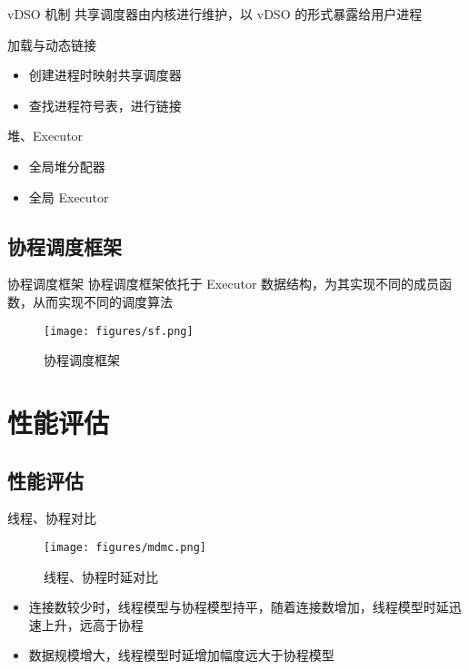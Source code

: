 \documentclass{beamer}
\begin{document}
\begin{frame}{vDSO 机制}
  共享调度器由内核进行维护，以 vDSO 的形式暴露给用户进程
  \begin{block}{加载与动态链接}
    \begin{itemize}
      \item 创建进程时映射共享调度器
      \item 查找进程符号表，进行链接
    \end{itemize}
  \end{block}
  \begin{block}{堆、Executor}
    \begin{itemize}
      \item 全局堆分配器
      \item 全局 Executor
    \end{itemize}
  \end{block}
  
\end{frame}

\subsection{协程调度框架}

\begin{frame}{协程调度框架}
  协程调度框架依托于 Executor 数据结构，为其实现不同的成员函数，从而实现不同的调度算法
  \begin{figure}[htbp]
    \centering
    \texttt{[image: figures/sf.png]}
    \caption{协程调度框架}
    \label{fig:sf}
  \end{figure}
\end{frame}


\section{性能评估}

\subsection{性能评估}

\begin{frame}{线程、协程对比}
  \begin{figure}[htbp]
    \centering
    \texttt{[image: figures/mdmc.png]}
    \caption{线程、协程时延对比}
    \label{fig:mdmc}
  \end{figure}
  \begin{itemize}
    \setlength{\itemsep}{6pt}
    \item 连接数较少时，线程模型与协程模型持平，随着连接数增加，线程模型时延迅速上升，远高于协程
    \item 数据规模增大，线程模型时延增加幅度远大于协程模型
  \end{itemize} 
\end{frame}
\end{document}
